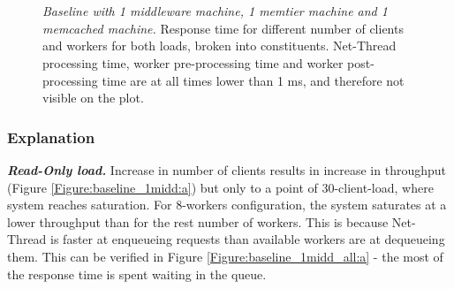 \documentclass[11pt,a4paper]{article}
\begin{document}
\begin{figure}[ht!]
	\centering	
	\\
	\\
	\caption{\textit{Baseline with 1 middleware machine, 1 memtier machine and 1 memcached machine.} Response time for different number of clients and workers for both loads, broken into constituents. Net-Thread processing time, worker pre-processing time and worker post-processing time are at all times lower than 1 ms, and therefore not visible on the plot.}
	\label{Figure:baseline_1midd_all}	
\end{figure}

\subsubsection{Explanation}

\textit{\textbf{Read-Only load.}} Increase in number of clients results in increase in throughput (Figure \ref{Figure:baseline_1midd:a}) but only to a point of 30-client-load, where system reaches saturation. For 8-workers configuration, the system saturates at a lower throughput than for the rest number of workers. This is because Net-Thread is faster at enqueueing requests than available workers are at dequeueing them. This can be verified in Figure \ref{Figure:baseline_1midd_all:a} - the most of the response time is spent waiting in the queue. 
\end{document}
